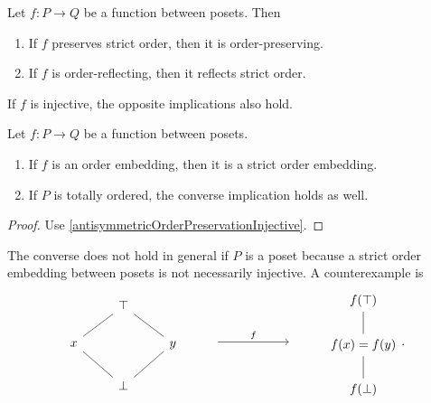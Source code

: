 \begin{lemma}
Let $f:P\to Q$ be a function between posets. Then
\begin{enumerate}
\item If $f$ preserves strict order, then it is order-preserving.
\item If $f$ is order-reflecting, then it reflects strict order.
\end{enumerate}
If $f$ is injective, the opposite implications also hold.
\end{lemma}
\begin{corollary}
Let $f: P\to Q$ be a function between posets.
\begin{enumerate}
\item If $f$ is an order embedding, then it is a strict order embedding.
\item If $P$ is totally ordered, the converse implication holds as well.
\end{enumerate}
\end{corollary}
\begin{proof}
Use \ref{antisymmetricOrderPreservationInjective}.
\end{proof}

The converse does not hold in general if $P$ is a poset because a strict order embedding between posets is not necessarily injective. A counterexample is
\[
\begin{tikzcd}
& \top & \\
x \ar[ur, dash] & & y \ar[ul, dash] \\
& \bot \ar[ul, dash] \ar[ur, dash] &
\end{tikzcd} \qquad \begin{tikzcd} {} \arrow[rr, "f"] & {}& {}\end{tikzcd} \qquad \begin{tikzcd}
f(\top) \\ f(x) = f(y) \ar[u,dash] \\ f(\bot) \ar[u,dash]
\end{tikzcd}.
\]

